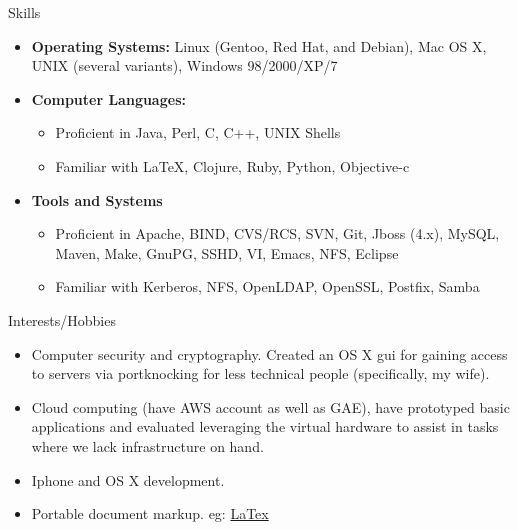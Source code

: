 \documentclass[11pt,oneside]{article}
\newenvironment{ressection}[1]{
        \vspace{4pt}
        {\fontfamily{phv}\selectfont\Large#1}
        \begin{itemize}
        \vspace{3pt}
}{
        \end{itemize}
}
\newcommand{\resitem}[1]{
        \vspace{-4pt}
        \item \begin{flushleft} #1 \end{flushleft}
}
\newcommand{\ressubitem}[1]{
        \vspace{-1pt}
        \item \begin{flushleft} #1 \end{flushleft}
}
\newenvironment{reslist}[1]{
        \resitem{\textbf{#1}}
        \vspace{-5pt}
        \begin{itemize}
}{
        \end{itemize}
}
\begin{document}
\begin{ressection}{Skills}

  \resitem{\textbf{Operating Systems:} Linux (Gentoo, Red Hat, and
    Debian), Mac OS X, UNIX (several variants), Windows 98/2000/XP/7}

  \begin{reslist}{Computer Languages:}

    \ressubitem{Proficient in Java, Perl, C, C++,  UNIX Shells}

    \ressubitem{Familiar with \LaTeX, Clojure, Ruby, Python, Objective-c}

  \end{reslist}

  \begin{reslist}{Tools and Systems}

    \ressubitem{Proficient in Apache, BIND, CVS/RCS, SVN, Git, Jboss
      (4.x), MySQL, Maven, Make, GnuPG, SSHD, VI, Emacs, NFS, Eclipse}

    \ressubitem{Familiar with Kerberos, NFS, OpenLDAP, OpenSSL, Postfix, Samba}

  \end{reslist}


\end{ressection}


\begin{ressection}{Interests/Hobbies}

  \resitem{Computer security and cryptography. Created an OS X gui for
    gaining access to servers via portknocking for less technical
    people (specifically, my wife).}

  \resitem{Cloud computing (have AWS account as well as GAE), have
    prototyped basic applications and evaluated leveraging the virtual
    hardware to assist in tasks where we lack infrastructure on hand.}

  \resitem{Iphone and OS X development.}

  \resitem{Portable document markup. eg: \href{https://github.com/jstelzer/Resume/blob/master/stelzer-res.tex}{LaTex}}

\end{ressection}
\end{document}
